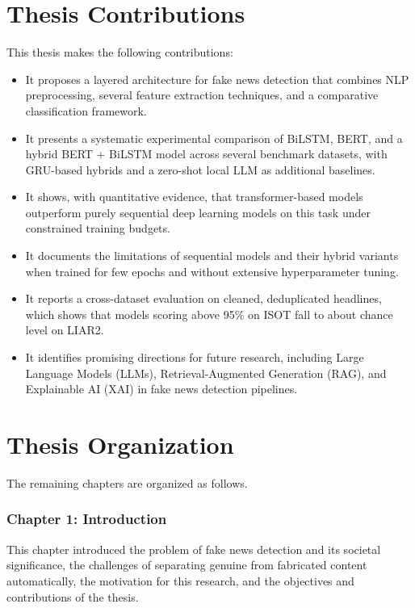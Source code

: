 \section{Thesis Contributions}

This thesis makes the following contributions:

\begin{itemize}
\item It proposes a layered architecture for fake news detection that combines NLP preprocessing, several feature extraction techniques, and a comparative classification framework.
\item It presents a systematic experimental comparison of BiLSTM, BERT, and a hybrid BERT + BiLSTM model across several benchmark datasets, with GRU-based hybrids and a zero-shot local LLM as additional baselines.
\item It shows, with quantitative evidence, that transformer-based models outperform purely sequential deep learning models on this task under constrained training budgets.
\item It documents the limitations of sequential models and their hybrid variants when trained for few epochs and without extensive hyperparameter tuning.
\item It reports a cross-dataset evaluation on cleaned, deduplicated headlines, which shows that models scoring above 95\% on ISOT fall to about chance level on LIAR2.
\item It identifies promising directions for future research, including Large Language Models (LLMs), Retrieval-Augmented Generation (RAG), and Explainable AI (XAI) in fake news detection pipelines.
\end{itemize}

\section{Thesis Organization}

The remaining chapters are organized as follows.

\subsubsection*{Chapter 1: Introduction}

This chapter introduced the problem of fake news detection and its societal significance, the challenges of separating genuine from fabricated content automatically, the motivation for this research, and the objectives and contributions of the thesis.

